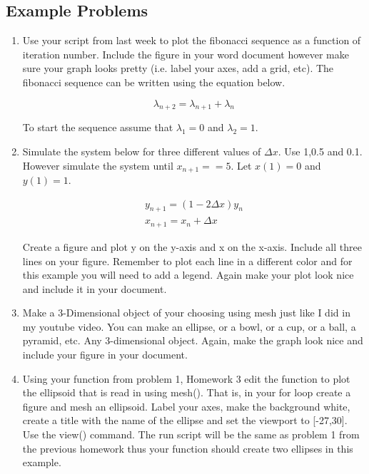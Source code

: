 \subsection{Example Problems}

\begin{enumerate}

\item Use your script from last week to plot the fibonacci sequence as
  a function of iteration number. Include the figure in your
  word document however make sure your graph looks pretty (i.e. label
  your axes, add a grid, etc). The fibonacci sequence can be written
  using the equation below.  

  \begin{equation}
    \lambda_{n+2} = \lambda_{n+1} + \lambda_{n}
  \end{equation}
  
  To start the sequence assume that $\lambda_{1} = 0$ and $\lambda_{2}
  = 1$. 

\item Simulate the system below for three different values of $\Delta
  x$. Use 1,0.5 and 0.1. However simulate the system until $x_{n+1} ==
  5$. Let $x(1) = 0$ and $y(1) = 1$.

\begin{equation}
\begin{matrix}
  y_{n+1} = (1-2\Delta x)y_{n} \\ x_{n+1} = x_{n} + \Delta x
\end{matrix}
\end{equation}

  Create a figure and plot y on the y-axis and x on the
  x-axis. Include all three lines on your figure. Remember to plot
  each line in a different color and for this example you will need to
  add a legend. Again make your plot look nice and include it in your
  document. 

\item Make a 3-Dimensional object of your choosing using mesh just
  like I did in my youtube video. You can make an ellipse, or a bowl,
  or a cup, or a ball, a pyramid, etc. Any 3-dimensional
  object. Again, make the graph look nice and include your figure in
  your document. 

\item Using your function from problem 1, Homework 3 edit the function to
plot the ellipsoid that is read in using mesh(). That is, in your for
loop create a figure and mesh an ellipsoid. Label your axes, make the
background white, create a title with the name of the ellipse and set
the viewport to [-27,30]. Use the view() command. The run script will
be the same as problem 1 from the previous homework thus your function
should create two ellipses in this example.
\ \\


\end{enumerate}
